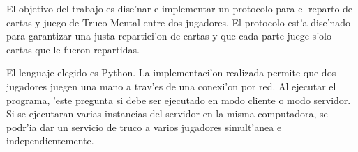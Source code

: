 El objetivo del trabajo es dise'nar e implementar un protocolo para el reparto de cartas y juego de Truco Mental entre dos jugadores.
El protocolo est'a dise'nado para garantizar una justa repartici'on de cartas y que cada parte juege s'olo cartas que le fueron repartidas.

El lenguaje elegido es Python. La implementaci'on realizada permite que dos jugadores juegen una mano a trav'es de una conexi'on por red. Al ejecutar el programa, 'este pregunta si debe ser ejecutado en modo cliente o modo servidor. Si se ejecutaran varias instancias del servidor en la misma computadora, se podr'ia dar un servicio de truco a varios jugadores simult'anea e independientemente.
